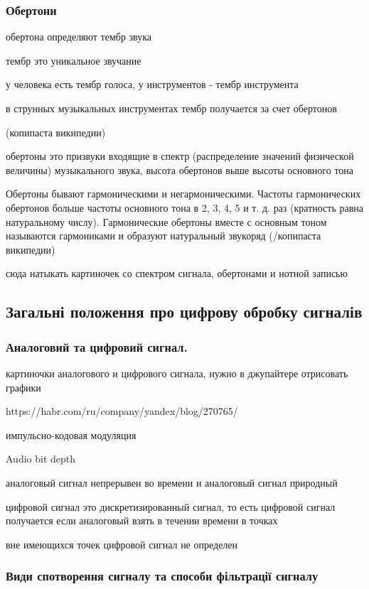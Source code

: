 \subsubsection{Обертони}

обертона определяют тембр звука

тембр это уникальное звучание 

у человека есть тембр голоса, у инструментов - тембр инструмента

в струнных музыкальных инструментах тембр получается за счет обертонов

(копипаста википедии)

обертоны это призвуки входящие в спектр (распределение значений физической величины) музыкального звука, высота обертонов выше высоты основного тона

Обертоны бывают гармоническими и негармоническими. Частоты гармонических обертонов больше частоты основного тона в 2, 3, 4, 5 и т. д. раз (кратность равна натуральному числу). Гармонические обертоны вместе с основным тоном называются гармониками и образуют натуральный звукоряд (/копипаста википедии)

сюда натыкать картиночек со спектром сигнала, обертонами и нотной записью

\subsection{Загальні положення про цифрову обробку сигналів}

\subsubsection{Аналоговий та цифровий сигнал.}

картиночки аналогового и цифрового сигнала, нужно в джупайтере отрисовать графики

https://habr.com/ru/company/yandex/blog/270765/

импульсно-кодовая модуляция

Audio bit depth



аналоговый сигнал непрерывен во времени и аналоговый сигнал природный

цифровой сигнал это дискретизированный сигнал, то есть цифровой сигнал получается если аналоговый взять в течении времени в точках

вне имеющихся точек цифровой сигнал не определен

\subsubsection{Види спотворення сигналу та способи фільтрації сигналу}


